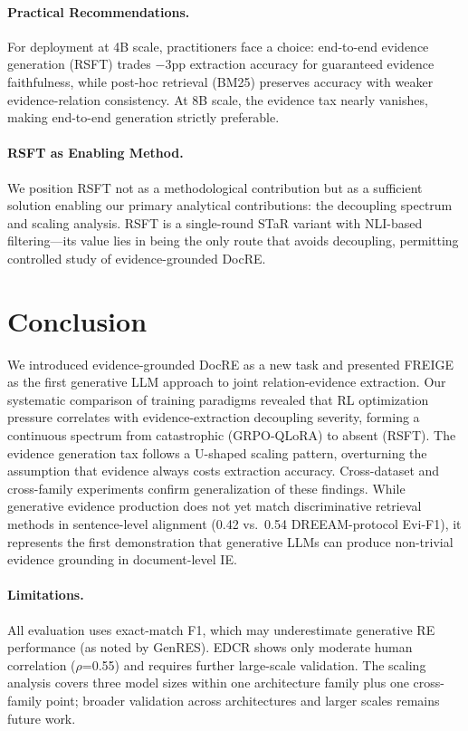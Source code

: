 \documentclass[11pt,a4paper]{article}
\begin{document}
\paragraph{Practical Recommendations.} For deployment at 4B scale, practitioners face a choice: end-to-end evidence generation (RSFT) trades $-$3pp extraction accuracy for guaranteed evidence faithfulness, while post-hoc retrieval (BM25) preserves accuracy with weaker evidence-relation consistency. At 8B scale, the evidence tax nearly vanishes, making end-to-end generation strictly preferable.

\paragraph{RSFT as Enabling Method.} We position RSFT not as a methodological contribution but as a sufficient solution enabling our primary analytical contributions: the decoupling spectrum and scaling analysis. RSFT is a single-round STaR variant with NLI-based filtering---its value lies in being the only route that avoids decoupling, permitting controlled study of evidence-grounded DocRE.

\section{Conclusion}

We introduced evidence-grounded DocRE as a new task and presented FREIGE as the first generative LLM approach to joint relation-evidence extraction. Our systematic comparison of training paradigms revealed that RL optimization pressure correlates with evidence-extraction decoupling severity, forming a continuous spectrum from catastrophic (GRPO-QLoRA) to absent (RSFT). The evidence generation tax follows a U-shaped scaling pattern, overturning the assumption that evidence always costs extraction accuracy. Cross-dataset and cross-family experiments confirm generalization of these findings. While generative evidence production does not yet match discriminative retrieval methods in sentence-level alignment (0.42 vs.\ 0.54 DREEAM-protocol Evi-F1), it represents the first demonstration that generative LLMs can produce non-trivial evidence grounding in document-level IE.

\paragraph{Limitations.} All evaluation uses exact-match F1, which may underestimate generative RE performance (as noted by GenRES). EDCR shows only moderate human correlation ($\rho$=0.55) and requires further large-scale validation. The scaling analysis covers three model sizes within one architecture family plus one cross-family point; broader validation across architectures and larger scales remains future work.
\end{document}
